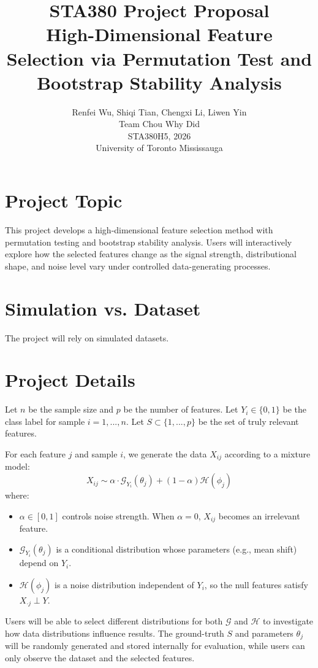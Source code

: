 \documentclass{article}
\title{
    \textbf{\fontsize{16}{19.2}\selectfont STA380 Project Proposal}\\[1em]
    \fontsize{11}{13.2}\selectfont High-Dimensional Feature Selection via Permutation Test and Bootstrap Stability Analysis
}
\author{
    \fontsize{11}{13.2}\selectfont
    Renfei Wu, Shiqi Tian, Chengxi Li, Liwen Yin \\
    \fontsize{11}{13.2}\selectfont
    Team Chou Why Did \\
    \fontsize{11}{13.2}\selectfont
    STA380H5, 2026 \\
    \fontsize{11}{13.2}\selectfont
    University of Toronto Mississauga
}
\date{}
\begin{document}
\maketitle

\section{Project Topic}
This project develops a high-dimensional feature selection method with permutation testing and bootstrap stability analysis. Users will interactively explore how the selected features change as the signal strength, distributional shape, and noise level vary under controlled data-generating processes.

\section{Simulation vs. Dataset}
The project will rely on simulated datasets.

\section{Project Details}
Let $n$ be the sample size and $p$ be the number of features. Let $Y_i \in \{0,1\}$ be the class label for sample $i=1,...,n$. Let $S\subset \{1,...,p\}$ be the set of truly relevant features. 

For each feature $j$ and sample $i$, we generate the data $X_{ij}$ according to a mixture model:
\[
X_{ij} \sim 
\alpha \cdot \mathcal{G}_{Y_i}(\theta_j) + (1-\alpha) \mathcal{H}(\phi_j)
\]
where:
\begin{itemize}[itemsep=0pt, parsep=0pt, topsep=0pt]
    \item $\alpha \in [0,1]$ controls noise strength. When $\alpha=0$, $X_{ij}$ becomes an irrelevant feature.
    \item $\mathcal{G}_{Y_i}(\theta_j)$ is a conditional distribution whose parameters (e.g., mean shift) depend on $Y_i$.
    \item $\mathcal{H}(\phi_j)$ is a noise distribution independent of $Y_i$, so the null features satisfy $X_{\cdot j} \perp Y$.
\end{itemize}

Users will be able to select different distributions for both $\mathcal{G}$ and $\mathcal{H}$ to investigate how data distributions influence results. The ground-truth $S$ and parameters $\theta_j$ will be randomly generated and stored internally for evaluation, while users can only observe the dataset and the selected features.
\end{document}
